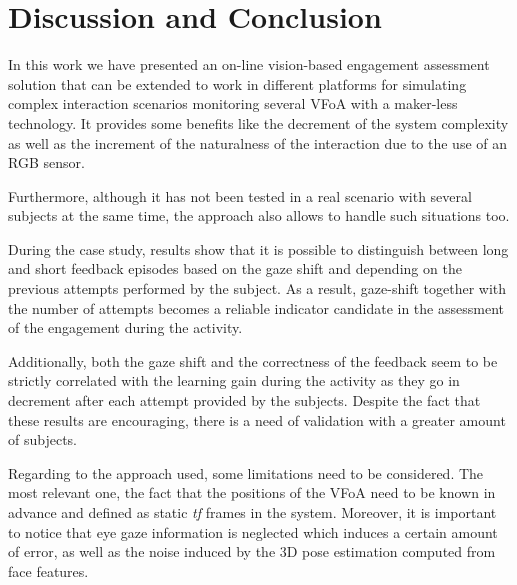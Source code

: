 \documentclass{sig-alternate}
\begin{document}



\section{Discussion and Conclusion}

In this work we have presented an on-line vision-based engagement assessment
solution that can be extended to work in different platforms for simulating
complex interaction scenarios monitoring several VFoA with a maker-less
technology. It provides some benefits like the decrement of the system
complexity as well as the increment of the naturalness of the interaction due to
the use of an RGB sensor.  

Furthermore, although it has not been tested in a real scenario with several
subjects at the same time, the approach also allows to handle such situations
too.

During the case study, results show that it is possible to distinguish between
long and short feedback episodes based on the gaze shift and depending on the
previous attempts performed by the subject. As a result, gaze-shift together
with the number of attempts becomes a reliable indicator candidate in the
assessment of the engagement during the activity.

Additionally, both the gaze shift and the correctness of the feedback seem to be
strictly correlated with the learning gain during the activity as they go in
decrement after each attempt provided by the subjects. Despite the fact that
these results are encouraging, there is a need of validation with a greater
amount of subjects.

Regarding to the approach used, some limitations need to be considered. The most
relevant one, the fact that the positions of the VFoA need to be known in
advance and defined as static \textit{tf} frames in the system. Moreover, it is
important to notice that eye gaze information is neglected which induces a
certain amount of error, as well as the noise induced by the 3D pose estimation
computed from face features.
\end{document}
